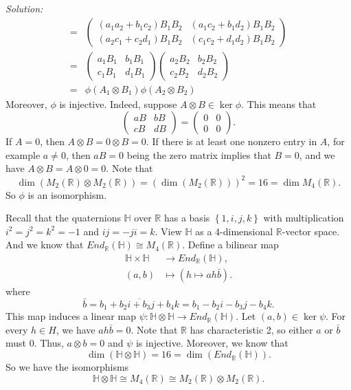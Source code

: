 \documentclass[a4paper, 12pt]{article}
\newenvironment{solution}
    {\textit{Solution:}}
    {}
\begin{document}
\begin{solution}
\begin{align*}
   =&\begin{pmatrix}
    (a_1a_2+b_1c_2)B_1B_2&(a_1c_2+b_1d_2)B_1B_2\\ 
    (a_2c_1+c_2d_1)B_1B_2&(c_1c_2+d_1d_2)B_1B_2
   \end{pmatrix}\\[1em] 
   =&\begin{pmatrix}
    a_1B_1&b_1B_1\\ 
    c_1B_1&d_1B_1
   \end{pmatrix}\begin{pmatrix}
    a_2B_2&b_2B_2\\ 
    c_2B_2&d_2B_2
   \end{pmatrix}\\[1em]
   =&\phi(A_1\otimes B_1)\phi(A_2\otimes B_2)
\end{align*}
Moreover, \(\phi\) is injective. Indeed, suppose \(A\otimes B\in \ker \phi\). This means that 
\[\begin{pmatrix}
    aB &bB\\
    cB &dB
\end{pmatrix}=\begin{pmatrix}
    0&0\\ 
    0&0
\end{pmatrix}.\]
If \(A=0\), then \(A\otimes B=0\otimes B=0\). If there is at least one nonzero entry in \(A\), for example \(a\neq 0\), then \(aB=0\) being the zero matrix implies 
that \(B=0\), and we have \(A\otimes B=A\otimes 0=0\). Note that 
\[\dim (M_2(\mathbb{R})\otimes M_2(\mathbb{R}))=(\dim(M_2(\mathbb{R})))^2=16=\dim M_4(\mathbb{R}).\]
So \(\phi\) is an isomorphism. 

Recall that the quaternions \(\mathbb{H}\) over \(\mathbb{R}\) has a basis \(\left\{ 1,i,j,k \right\}\) with multiplication \(i^2=j^2=k^2=-1\) and \(ij=-ji=k\). View \(\mathbb{H}\) as a 4-dimensional 
\(\mathbb{R}\)-vector space. And we know that \(End_{\mathbb{R}}(\mathbb{H})\cong M_4(\mathbb{R})\). Define a bilinear map 
\begin{align*}
    \mathbb{H}\times \mathbb{H}&\rightarrow End_{\mathbb{R}}(\mathbb{H}),\\ 
    (a,b)&\mapsto (h\mapsto ah\bar{b}).
\end{align*}
where 
\[\bar{b}=\overline{b_1+b_2i+b_3j+b_4k}=b_1-b_2i-b_3j-b_4k.\]
This map induces a linear map \(\psi:\mathbb{H}\otimes \mathbb{H}\rightarrow End_{\mathbb{R}}(\mathbb{H})\). Let \((a,b)\in \ker \psi\). For every \(h\in H\), we have 
\(ah\bar{b}=0\). Note that \(\mathbb{R}\) has characteristic 2, so either \(a\) or \(\bar{b}\) must \(0\). Thus, \(a\otimes b=0\) and \(\psi\) is injective. Moreover, we know that 
\[\dim(\mathbb{H}\otimes \mathbb{H})=16=\dim (End_{\mathbb{R}}(\mathbb{H})).\]
So we have the isomorphisms 
\[\mathbb{H}\otimes \mathbb{H}\cong M_4(\mathbb{R})\cong M_2(\mathbb{R})\otimes M_2(\mathbb{R}).\]
\end{solution}
\end{document}
